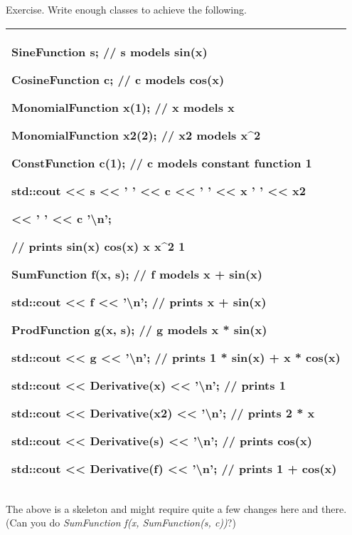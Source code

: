 \documentclass[
]{article}
\begin{document}
Exercise. Write enough classes to achieve the following.

\begin{longtable}[]{@{}l@{}}
\toprule
\endhead
\begin{minipage}[t]{0.97\columnwidth}\raggedright
SineFunction s; // s models sin(x)

CosineFunction c; // c models cos(x)

MonomialFunction x(1); // x models x

MonomialFunction x2(2); // x2 models x\^{}2

ConstFunction c(1); // c models constant function 1

std::cout \textless\textless{} s \textless\textless{} ' '
\textless\textless{} c \textless\textless{} ' ' \textless\textless{} x '
' \textless\textless{} x2

\textless\textless{} ' ' \textless\textless{} c '\textbackslash n';

// prints sin(x) cos(x) x x\^{}2 1

SumFunction f(x, s); // f models x + sin(x)

std::cout \textless\textless{} f \textless\textless{}
'\textbackslash n'; // prints x + sin(x)

ProdFunction g(x, s); // g models x * sin(x)

std::cout \textless\textless{} g \textless\textless{}
'\textbackslash n'; // prints 1 * sin(x) + x * cos(x)

std::cout \textless\textless{} Derivative(x) \textless\textless{}
'\textbackslash n'; // prints 1

std::cout \textless\textless{} Derivative(x2) \textless\textless{}
'\textbackslash n'; // prints 2 * x

std::cout \textless\textless{} Derivative(s) \textless\textless{}
'\textbackslash n'; // prints cos(x)

std::cout \textless\textless{} Derivative(f) \textless\textless{}
'\textbackslash n'; // prints 1 + cos(x)\strut
\end{minipage}\tabularnewline
\bottomrule
\end{longtable}

The above is a skeleton and might require quite a few changes here and
there. (Can you do \emph{SumFunction f(x, SumFunction(s, c))}?)
\end{document}
